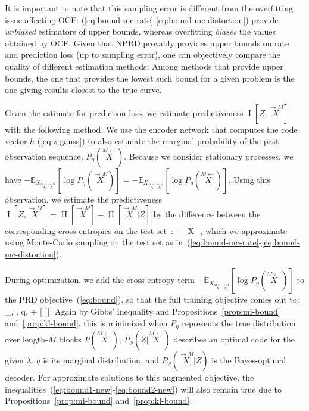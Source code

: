 \documentclass[entropy,article,submit,moreauthors,pdftex,10pt,a4paper]{Definitions/mdpi}
\newcommand{\finitefuture}{\stackrel{\rightarrow \scriptscriptstyle{M}}{X}}
\newcommand{\finitepast}{\stackrel{\scriptscriptstyle{M}\leftarrow}{X}}%
\let\oldequation\equation
\let\oldendequation\endequation
\renewenvironment{equation}
  {\linenomathNonumbers\oldequation}
  {\oldendequation\endlinenomath}
\begin{document}
It is important to note that this sampling error is different from the overfitting issue affecting OCF: 
(\ref{eq:bound-mc-rate}-\ref{eq:bound-mc-distortion}) provide \emph{unbiased} estimators of upper bounds, whereas overfitting \emph{biases} the values obtained by OCF.
Given that NPRD provably provides upper bounds on rate and prediction loss (up to sampling error), one can objectively compare the quality of different estimation methods:
Among methods that provide upper bounds, the one that provides the lowest such bound for a given problem is the one giving results closest to the true curve.

Given the estimate for prediction loss, we estimate predictiveness $\operatorname{I}[Z, \finitefuture]$ with the following method.
We use the encoder network that computes the code vector $h$ (\ref{eq:z-gauss}) to also estimate the marginal probability of the past observation sequence, $P_\eta(\finitepast)$. Because we consider stationary processes, we have 
$- \mathbb{E}_{X_{\finitepast\finitefuture}}\left[\log P_\eta(\finitefuture)\right] = - \mathbb{E}_{X_{\finitepast\finitefuture}}\left[\log P_\eta(\finitepast)\right]$.
Using this observation, we estimate the predictiveness $\operatorname{I}[Z, \finitefuture] = \operatorname{H}[\finitefuture] - \operatorname{H}[\finitefuture|Z]$ by the difference between the corresponding cross-entropies on the test set~\cite{mcallester2018formal}:
\begin{equation}\label{eq:bound-mc-predictiveness}
- _{X_{\finitepast\finitefuture}}\left[\log P_\eta(\finitefuture) - \log P_\psi(\finitefuture | Z)\right],
\end{equation}
which we approximate using Monte-Carlo sampling on the test set as in~(\ref{eq:bound-mc-rate}-\ref{eq:bound-mc-distortion}).

During optimization, we add the cross-entropy term $- \mathbb{E}_{X_{\finitepast\finitefuture}}\left[\log P_\eta(\finitepast)\right]$ to the PRD objective~(\ref{eq:bound}), so that the full training objective comes out to:
\begin{equation}\label{eq:bound-augmented}
	\min_{\phi, \psi, q,\eta} \left[\mathbb{E}_{\finitepast, \finitefuture}	\log P_\eta(\finitepast) + \left[-	\mathbb{E}_{Z \sim \phi(\finitepast)}\left[\log P_\psi(\finitefuture | Z)\right] + \lambda \cdot {} [ \infdivx{P_\phi(Z|\finitepast)}{q(Z)}\right]\right].
\end{equation} %
Again by Gibbs' inequality and Propositions~\ref{prop:mi-bound} and~\ref{prop:kl-bound}, this is minimized when $P_\eta$ represents the true distribution over length-$M$ blocks $P(\finitepast)$, $P_\phi(Z|\finitepast)$ describes an optimal code for the given $\lambda$, $q$ is its marginal distribution, and $P_\psi(\finitefuture|Z)$ is the Bayes-optimal decoder.
For approximate solutions to this augmented objective, the inequalities~(\ref{eq:bound1-new}-\ref{eq:bound2-new}) will also remain true due to Propositions~\ref{prop:mi-bound} and~\ref{prop:kl-bound}.
\end{document}
